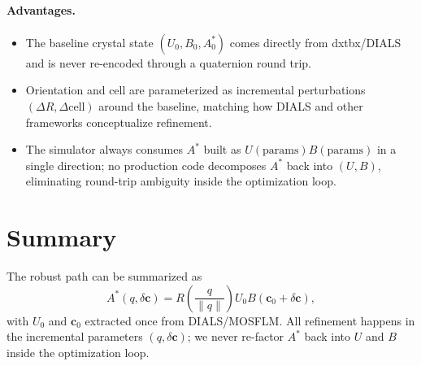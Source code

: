 \documentclass[11pt]{article}
\begin{document}
\paragraph{Advantages.}
\begin{itemize}
  \item The baseline crystal state $(U_0,B_0,A^\ast_0)$ comes directly from
        dxtbx/DIALS and is never re-encoded through a quaternion round trip.
  \item Orientation and cell are parameterized as incremental perturbations
        $(\Delta R, \Delta\text{cell})$ around the baseline, matching how
        DIALS and other frameworks conceptualize refinement.
  \item The simulator always consumes $A^\ast$ built as $U(\text{params}) B(\text{params})$
        in a single direction; no production code decomposes $A^\ast$ back into
        $(U,B)$, eliminating round-trip ambiguity inside the optimization loop.
\end{itemize}

\section{Summary}

The robust path can be summarized as
\begin{equation}
  A^\ast(q, \delta\mathbf{c})
  =
  R\!\left(\frac{q}{\|q\|}\right)
  U_0
  B(\mathbf{c}_0 + \delta\mathbf{c}),
\end{equation}
with $U_0$ and $\mathbf{c}_0$ extracted once from DIALS/MOSFLM.
All refinement happens in the incremental parameters $(q, \delta\mathbf{c})$;
we never re-factor $A^\ast$ back into $U$ and $B$ inside the optimization loop.
\end{document}
